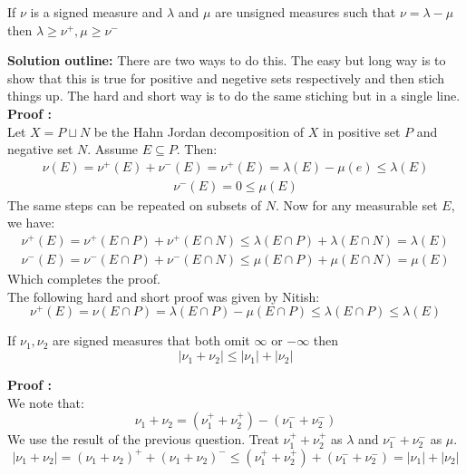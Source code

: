 \documentclass[notoc]{tufte-book}
\begin{document}
\begin{tcolorbox}[colback=c4,colframe=c3,title=Problem 3.4]
	If $\nu$ is a signed measure and $\lambda$ and $\mu$  are unsigned measures such that $\nu=\lambda-\mu$ then $\lambda\geq\nu^+,\mu\geq\nu^-$
\end{tcolorbox}
\textbf{Solution outline: }There are two ways to do this. The easy but long way is to show that this is true for positive and negetive sets respectively and then stich things up. The hard and short way is to do the same stiching but in a single line.\\
\textbf{Proof : }\\
Let $X=P\sqcup N$ be the Hahn Jordan decomposition of $X$ in positive set $P$ and negative set $N$. Assume $E\subseteq P$. Then:
\begin{align*}
	\nu(E)=\nu^+(E)+\nu^-(E)=\nu^+(E)=\lambda(E)-\mu(e)\leq\lambda(E)
\end{align*}
\begin{align*}
	\nu^-(E)=0\leq\mu(E)
\end{align*}
The same steps can be repeated on subsets of $N$. Now for any measurable set $E$, we have:
\begin{align*}
	\nu^+(E)=\nu^+(E\cap P)+\nu^+(E\cap N)\leq \lambda(E\cap P)+\lambda(E\cap N)=\lambda(E)\\
	\nu^-(E)=\nu^-(E\cap P)+\nu^-(E\cap N)\leq \mu(E\cap P)+\mu(E\cap N)=\mu(E)
\end{align*}
Which completes the proof.\\
The following hard and short proof was given by Nitish:
$$\nu^+(E)=\nu(E\cap P)=\lambda(E\cap P)-\mu(E\cap P)\leq \lambda(E\cap P)\leq \lambda(E)$$


\begin{tcolorbox}[colback=c4,colframe=c3,title=Problem 3.5]
	If $\nu_1,\nu_2$ are signed measures that both omit $\infty$ or $-\infty$ then 
	$$|\nu_1+\nu_2|\leq|\nu_1|+|\nu_2|$$
\end{tcolorbox}
\textbf{Proof :}\\
We note that:
$$\nu_1+\nu_2=(\nu_1^++\nu_2^+)-(\nu_1^-+\nu_2^-)$$
We use  the result of the previous question. Treat $\nu_1^++\nu_2^+$ as $\lambda$ and $\nu_1^-+\nu_2^-$ as $\mu$. 
$$|\nu_1+\nu_2|=(\nu_1+\nu_2)^++(\nu_1+\nu_2)^-\leq (\nu_1^++\nu_2^+)+(\nu_1^-+\nu_2^-)=|\nu_1|+|\nu_2| $$
\end{document}
